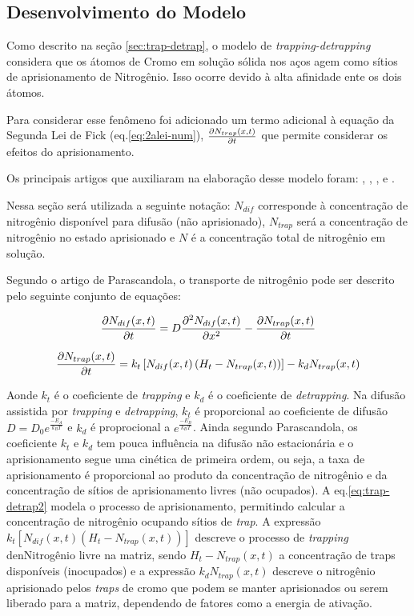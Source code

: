 \subsection{Desenvolvimento do Modelo}
\label{sec:trap-detrap-desenvolvimento}
Como descrito na seção \autoref{sec:trap-detrap}, o modelo de \textit{trapping-detrapping} considera que os átomos de Cromo em solução sólida nos aços agem como sítios de aprisionamento de Nitrogênio. Isso ocorre devido à alta afinidade ente os dois átomos.

Para considerar esse fenômeno foi adicionado um termo adicional à equação da Segunda Lei de Fick (eq.\autoref{eq:2alei-num}), $\pdv{N_{trap}(x,t)}{t}$ que permite considerar os efeitos do aprisionamento. 

Os principais artigos que auxiliaram na elaboração desse modelo foram:
\cite{moskalioviene2011modeling}, \cite{parascandola2000nitrogen}, \cite{moller1983pidat}, \cite{peng2018numerical} e \cite{moller2001surface}.  

Nessa seção será utilizada a seguinte notação: $N_{dif}$ corresponde à concentração de nitrogênio disponível para difusão (não aprisionado), $N_{trap}$ será a concentração de nitrogênio no estado aprisionado e $N$ é a concentração total de nitrogênio em solução.

Segundo o artigo de Parascandola, o transporte de nitrogênio pode ser descrito pelo seguinte conjunto de equações:

\begin{equation}
\label{eq:trap-detrap}
\pdv{N_{dif}(x,t)}{t} = D\pdv[2]{N_{dif}(x,t)}{x} - \pdv{N_{trap}(x,t)}{t} 
\end{equation}

\begin{equation}
\label{eq:trap-detrap2}
\pdv{N_{trap}(x,t)}{t} = k_t\left[N_{dif}(x,t)\left(H_t-N_{trap}(x,t)\right)\right] - k_dN_{trap}(x,t)
\end{equation}

Aonde $k_t$ é o coeficiente de \textit{trapping} e $k_d$ é o coeficiente de \textit{detrapping}. Na difusão assistida por \textit{trapping} e \textit{detrapping}, $k_t$ é proporcional ao coeficiente de difusão ${D=D_0e^{\frac{-E_A}{k_BT}}}$ e $k_d$ é proprocional a ${e^{\frac{-E_B}{k_BT}}}$. Ainda segundo Parascandola, os coeficiente $k_t$ e $k_d$ tem pouca influência na difusão não estacionária e o aprisionamento segue uma cinética de primeira ordem, ou seja, a taxa de aprisionamento é proporcional ao produto da concentração de nitrogênio e da concentração de sítios de aprisionamento livres (não ocupados). A eq.\autoref{eq:trap-detrap2} modela o processo de aprisionamento, permitindo calcular a concentração de nitrogênio ocupando sítios de \textit{trap}. A expressão $k_t\left[N_{dif}(x,t)\left(H_t-N_{trap}(x,t)\right)\right]$ descreve o processo de \textit{trapping} denNitrogênio livre na matriz, sendo $H_t - N_{trap}(x,t)$ a concentração de traps disponíveis (inocupados) e a expressão $ k_dN_{trap}(x,t)$ descreve o nitrogênio aprisionado pelos \textit{traps} de cromo que podem se manter aprisionados ou serem liberado para a matriz, dependendo de fatores como a energia de ativação.


